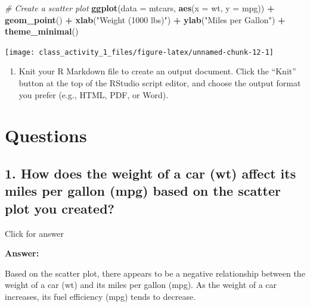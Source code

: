 \documentclass[
]{book}
\newenvironment{Shaded}{\begin{snugshade}}{\end{snugshade}}
\newcommand{\AttributeTok}[1]{\textcolor[rgb]{0.13,0.29,0.53}{#1}}
\newcommand{\CommentTok}[1]{\textcolor[rgb]{0.56,0.35,0.01}{\textit{#1}}}
\newcommand{\FunctionTok}[1]{\textcolor[rgb]{0.13,0.29,0.53}{\textbf{#1}}}
\newcommand{\NormalTok}[1]{#1}
\newcommand{\SpecialCharTok}[1]{\textcolor[rgb]{0.81,0.36,0.00}{\textbf{#1}}}
\newcommand{\StringTok}[1]{\textcolor[rgb]{0.31,0.60,0.02}{#1}}
\providecommand{\tightlist}{%
  \setlength{\itemsep}{0pt}\setlength{\parskip}{0pt}}
\begin{document}
\begin{Shaded}
\begin{Highlighting}[]
\CommentTok{\# Create a scatter plot}
\FunctionTok{ggplot}\NormalTok{(}\AttributeTok{data =}\NormalTok{ mtcars, }\FunctionTok{aes}\NormalTok{(}\AttributeTok{x =}\NormalTok{ wt, }\AttributeTok{y =}\NormalTok{ mpg)) }\SpecialCharTok{+}
  \FunctionTok{geom\_point}\NormalTok{() }\SpecialCharTok{+}
  \FunctionTok{xlab}\NormalTok{(}\StringTok{"Weight (1000 lbs)"}\NormalTok{) }\SpecialCharTok{+}
  \FunctionTok{ylab}\NormalTok{(}\StringTok{"Miles per Gallon"}\NormalTok{) }\SpecialCharTok{+}
  \FunctionTok{theme\_minimal}\NormalTok{()}
\end{Highlighting}
\end{Shaded}

\texttt{[image: class\_activity\_1\_files/figure-latex/unnamed-chunk-12-1]}

\begin{enumerate}
\def\labelenumi{\arabic{enumi}.}
\setcounter{enumi}{2}
\tightlist
\item
  Knit your R Markdown file to create an output document. Click the ``Knit'' button at the top of the RStudio script editor, and choose the output format you prefer (e.g., HTML, PDF, or Word).
\end{enumerate}

\vspace*{0.5in}

\hypertarget{questions}{%
\section{Questions}\label{questions}}

\hypertarget{how-does-the-weight-of-a-car-wt-affect-its-miles-per-gallon-mpg-based-on-the-scatter-plot-you-created}{%
\subsection{1. How does the weight of a car (wt) affect its miles per gallon (mpg) based on the scatter plot you created?}\label{how-does-the-weight-of-a-car-wt-affect-its-miles-per-gallon-mpg-based-on-the-scatter-plot-you-created}}

Click for answer

\textbf{Answer:}

Based on the scatter plot, there appears to be a negative relationship between the weight of a car (wt) and its miles per gallon (mpg). As the weight of a car increases, its fuel efficiency (mpg) tends to decrease.
\end{document}
